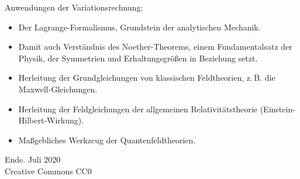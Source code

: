 \documentclass{beamer}
\newcommand{\modest}[1]{{\small\color{gray}#1}}
\begin{document}
\begin{frame}
Anwendungen der Variationsrechnung:
\begin{itemize}
\item Der Lagrange-Formalismus, Grundstein der analytischen Mechanik.

\item Damit auch Verständnis des Noether-Theorems, einem
Fundamentalsatz der Physik, der Symmetrien und Erhaltungsgrößen
in Beziehung setzt.

\item Herleitung der Grundgleichungen von klassischen Feldtheorien,
z.\,B. die Maxwell-Gleichungen.

\item Herleitung der Feldgleichungen der allgemeinen
Relativitätstheorie (Einstein-Hilbert-Wirkung).

\item Maßgebliches Werkzeug der Quantenfeldtheorien.
\end{itemize}
\end{frame}

\begin{frame}
Ende.
\vfill\hfill\modest{Juli 2020}\\
\hfill\modest{Creative Commons CC0}
\end{frame}
\end{document}
